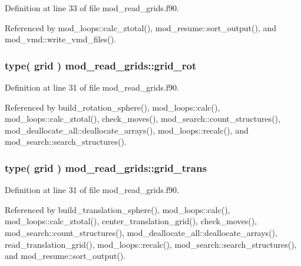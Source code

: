 Definition at line 33 of file mod\+\_\+read\+\_\+grids.\+f90.



Referenced by mod\+\_\+loops\+::calc\+\_\+ztotal(), mod\+\_\+resume\+::sort\+\_\+output(), and mod\+\_\+vmd\+::write\+\_\+vmd\+\_\+files().

\subsubsection[{\texorpdfstring{grid\+\_\+rot}{grid_rot}}]{\setlength{\rightskip}{0pt plus 5cm}type( {\bf grid} ) mod\+\_\+read\+\_\+grids\+::grid\+\_\+rot}\hypertarget{namespacemod__read__grids_a0e370bf7268cf2484361751a7c2cbee5}{}\label{namespacemod__read__grids_a0e370bf7268cf2484361751a7c2cbee5}


Definition at line 31 of file mod\+\_\+read\+\_\+grids.\+f90.



Referenced by build\+\_\+rotation\+\_\+sphere(), mod\+\_\+loops\+::calc(), mod\+\_\+loops\+::calc\+\_\+ztotal(), check\+\_\+moves(), mod\+\_\+search\+::count\+\_\+structures(), mod\+\_\+deallocate\+\_\+all\+::deallocate\+\_\+arrays(), mod\+\_\+loops\+::recalc(), and mod\+\_\+search\+::search\+\_\+structures().

\subsubsection[{\texorpdfstring{grid\+\_\+trans}{grid_trans}}]{\setlength{\rightskip}{0pt plus 5cm}type( {\bf grid} ) mod\+\_\+read\+\_\+grids\+::grid\+\_\+trans}\hypertarget{namespacemod__read__grids_ab09110371e13fa11f9a839bde8da8fc7}{}\label{namespacemod__read__grids_ab09110371e13fa11f9a839bde8da8fc7}


Definition at line 31 of file mod\+\_\+read\+\_\+grids.\+f90.



Referenced by build\+\_\+translation\+\_\+sphere(), mod\+\_\+loops\+::calc(), mod\+\_\+loops\+::calc\+\_\+ztotal(), center\+\_\+translation\+\_\+grid(), check\+\_\+moves(), mod\+\_\+search\+::count\+\_\+structures(), mod\+\_\+deallocate\+\_\+all\+::deallocate\+\_\+arrays(), read\+\_\+translation\+\_\+grid(), mod\+\_\+loops\+::recalc(), mod\+\_\+search\+::search\+\_\+structures(), and mod\+\_\+resume\+::sort\+\_\+output().

